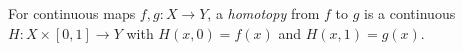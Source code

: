 
For continuous maps $f,g:X\to Y$, a \emph{homotopy} from $f$ to $g$ is a continuous $H:X\times[0,1]\to Y$ with $H(x,0)=f(x)$ and $H(x,1)=g(x)$.
